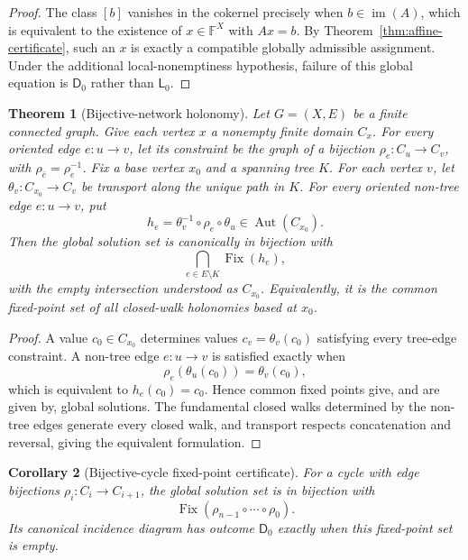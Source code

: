 \documentclass[11pt]{article}
\theoremstyle{plain}
\newtheorem{theorem}{Theorem}[section]
\newtheorem{corollary}[theorem]{Corollary}
\theoremstyle{definition}
\theoremstyle{remark}
\begin{document}
\begin{proof}
The class $[b]$ vanishes in the cokernel precisely when
$b\in\operatorname{im}(A)$, which is equivalent to the existence of
$x\in\mathbb F^X$ with $Ax=b$. By Theorem~\ref{thm:affine-certificate}, such an
$x$ is exactly a compatible globally admissible assignment. Under the additional
local-nonemptiness hypothesis, failure of this global equation is
$\mathsf D_0$ rather than $\mathsf L_0$.
\end{proof}

\begin{theorem}[Bijective-network holonomy]
\label{thm:network-holonomy}
Let $G=(X,E)$ be a finite connected graph. Give each vertex $x$ a nonempty
finite domain $C_x$. For every oriented edge $e:u\to v$, let its constraint be
the graph of a bijection $\rho_e:C_u\to C_v$, with
$\rho_{\bar e}=\rho_e^{-1}$. Fix a base vertex $x_0$ and a spanning tree $K$.
For each vertex $v$, let $\theta_v:C_{x_0}\to C_v$ be transport along the
unique path in $K$. For every oriented non-tree edge $e:u\to v$, put
\[
h_e=\theta_v^{-1}\circ\rho_e\circ\theta_u
\in\operatorname{Aut}(C_{x_0}).
\]
Then the global solution set is canonically in bijection with
\[
\bigcap_{e\in E\setminus K}\operatorname{Fix}(h_e),
\]
with the empty intersection understood as $C_{x_0}$.
Equivalently, it is the common fixed-point set of all closed-walk holonomies
based at $x_0$.
\end{theorem}

\begin{proof}
A value $c_0\in C_{x_0}$ determines values
$c_v=\theta_v(c_0)$ satisfying every tree-edge constraint. A non-tree edge
$e:u\to v$ is satisfied exactly when
\[
\rho_e(\theta_u(c_0))=\theta_v(c_0),
\]
which is equivalent to $h_e(c_0)=c_0$. Hence common fixed points give, and are
given by, global solutions. The fundamental closed walks determined by the
non-tree edges generate every closed walk, and transport respects concatenation
and reversal, giving the equivalent formulation.
\end{proof}

\begin{corollary}[Bijective-cycle fixed-point certificate]
\label{cor:cycle-holonomy}
For a cycle with edge bijections
$\rho_i:C_i\to C_{i+1}$, the global solution set is in bijection with
\[
\operatorname{Fix}(\rho_{n-1}\circ\cdots\circ\rho_0).
\]
Its canonical incidence diagram has outcome $\mathsf D_0$ exactly when this
fixed-point set is empty.
\end{corollary}
\end{document}

